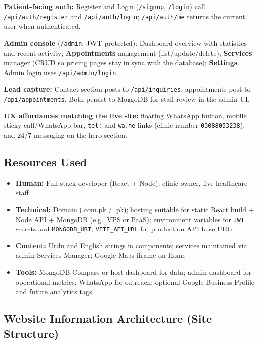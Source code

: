 \documentclass[12pt, a4paper]{article}
\begin{document}
\textbf{Patient-facing auth:} Register and Login (\texttt{/signup}, \texttt{/login}) call \texttt{/api/auth/register} and \texttt{/api/auth/login}; \texttt{/api/auth/me} returns the current user when authenticated.

\textbf{Admin console} (\texttt{/admin}, JWT-protected): Dashboard overview with statistics and recent activity; \textbf{Appointments} management (list/update/delete); \textbf{Services} manager (CRUD so pricing pages stay in sync with the database); \textbf{Settings}. Admin login uses \texttt{/api/admin/login}.

\textbf{Lead capture:} Contact section posts to \texttt{/api/inquiries}; appointments post to \texttt{/api/appointments}. Both persist to MongoDB for staff review in the admin UI.

\textbf{UX affordances matching the live site:} floating WhatsApp button, mobile sticky call/WhatsApp bar, \texttt{tel:} and \texttt{wa.me} links (clinic number \texttt{03088053238}), and 24/7 messaging on the hero section.

\subsection{Resources Used}

\begin{itemize}[leftmargin=1.4em]
    \item \textbf{Human:} Full-stack developer (React + Node), clinic owner, five healthcare staff
    \item \textbf{Technical:} Domain (.com.pk / .pk); hosting suitable for static React build + Node API + MongoDB (e.g.\ VPS or PaaS); environment variables for \texttt{JWT} secrets and \texttt{MONGODB\_URI}; \texttt{VITE\_API\_URL} for production API base URL
    \item \textbf{Content:} Urdu and English strings in components; services maintained via admin Services Manager; Google Maps iframe on Home
    \item \textbf{Tools:} MongoDB Compass or host dashboard for data; admin dashboard for operational metrics; WhatsApp for outreach; optional Google Business Profile and future analytics tags
\end{itemize}

\subsection{Website Information Architecture (Site Structure)}
\end{document}
